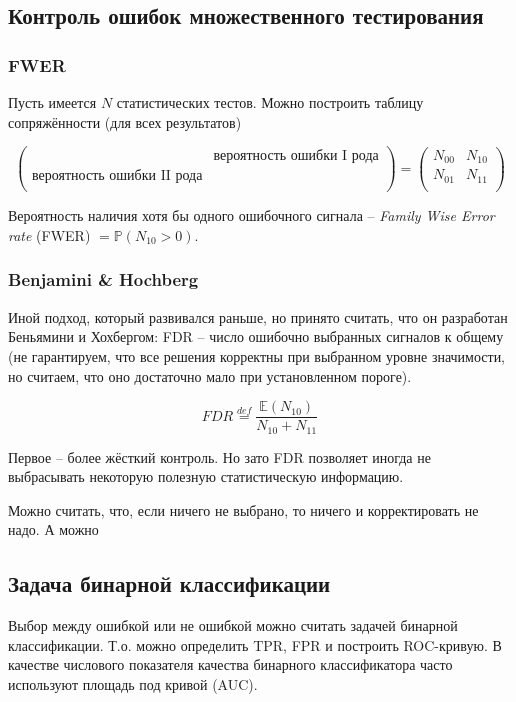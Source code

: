 \documentclass[main.tex]{subfiles}
\begin{document}
\subsection{ Контроль ошибок множественного тестирования}

\subsubsection{FWER}

Пусть имеется $ N $ статистических тестов.
Можно построить таблицу сопряжённости (для всех результатов)

\[ \begin{pmatrix}
	\text{} & \text{вероятность ошибки I рода} \\
	\text{вероятность ошибки II рода} & \text{} \\
\end{pmatrix} =
\begin{pmatrix}
	N_{00} & N_{10} \\
	N_{01} & N_{11} \\
\end{pmatrix} \]

Вероятность наличия хотя бы одного ошибочного сигнала -- \emph{Family Wise Error rate} (FWER) $ = \mathds P (N_{10} > 0) $.

\subsubsection{Benjamini \& Hochberg}

Иной подход, который развивался раньше, но принято считать, что он разработан Беньямини и Хохбергом:  FDR -- число ошибочно выбранных сигналов к общему (не гарантируем, что все решения корректны при выбранном уровне значимости, но считаем, что оно достаточно мало при установленном пороге).

\[ FDR \overset{def} = \frac{\mathds E (N_{10})}{ N_{10} + N_{11} } \]

Первое -- более жёсткий контроль.
Но зато FDR позволяет иногда не выбрасывать некоторую полезную статистическую информацию.

Можно считать, что, если ничего не выбрано, то ничего и корректировать не надо.
А можно %

\subsection{Задача бинарной классификации}

Выбор между ошибкой или не ошибкой можно считать задачей бинарной классификации.
Т.о. можно определить TPR, FPR и построить ROC-кривую.
В качестве числового показателя качества бинарного классификатора часто используют площадь под кривой (AUC).
\end{document}
